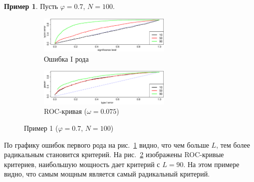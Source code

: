 \documentclass[specialist,
substylefile = spbu_report.rtx,
subf,href,colorlinks=true, 12pt]{disser}
\theoremstyle{definition}
\newtheorem{example}{Пример}
\begin{document}
\begin{example}\label{example1}
	Пусть $\varphi=0.7$, $N=100$.
	\begin{figure}[h!]
		\captionsetup[subfigure]{justification=Centering}
		\begin{subfigure}[t]{\textwidth}
			\centering
			\includegraphics[width=0.7\textwidth]{../cps2024/images/alphaI_phi7_N100.eps}
			\caption{Ошибка I рода}
			\label{alphaI_phi7_N100}
		\end{subfigure}
		\begin{subfigure}[t]{\textwidth}
			\centering
			\includegraphics[width=0.7\textwidth]{../cps2024/images/roc_phi7_N100.eps}
			\caption{ROC-кривая ($\omega=0.075$)}
			\label{roc_phi7_N100}
		\end{subfigure}
	\label{fig:example1}
	\caption{Пример 1 ($\varphi=0.7$, $N=100$)}
	\end{figure}
	По графику ошибок первого рода на рис.~\ref{alphaI_phi7_N100} видно, что чем больше $L$, тем более радикальным становится критерий. На рис.~\ref{roc_phi7_N100} изображены ROC-кривые критериев, наибольшую мощность дает критерий с $L=90$. На этом примере видно, что самым мощным является самый радикальный критерий. 
\end{example}
\end{document}
